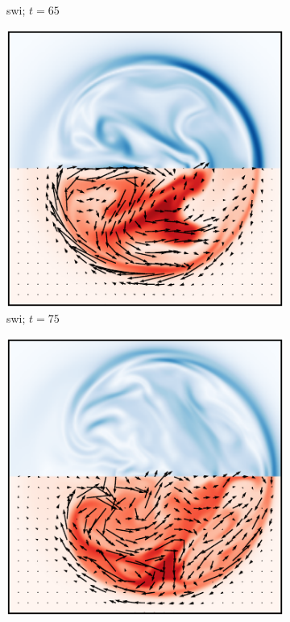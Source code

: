 \begin{figure}[t]
\begin{subfigure}[t]{0.32\textwidth}
    \caption{swi; $t=65$}
    \label{fig:final_switching_current_density_0013}
  \end{subfigure}
  \hfill
  \begin{subfigure}[t]{0.32\textwidth}
    \centering
    \includegraphics[width=\linewidth]{slices/final_switching_current_density_0015.pdf}
    \caption{swi; $t=75$}
    \label{fig:final_switching_current_density_0015}
  \end{subfigure}
  \hfill
  \begin{subfigure}[t]{0.32\textwidth}
    \centering
    \includegraphics[width=\linewidth]{slices/final_switching_current_density_0020.pdf}

\end{subfigure}
\end{figure}
